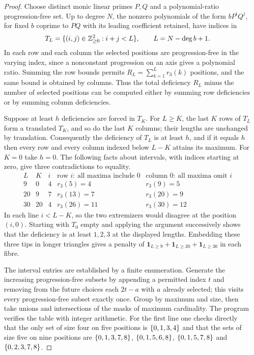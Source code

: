 \begin{proof}
Choose distinct monic linear primes $P,Q$ and a polynomial-ratio progression-free set.
Up to degree $N$, the nonzero polynomials of the form $bP^iQ^j$, for fixed $b$ coprime
to $PQ$ with its leading coefficient retained, have indices in
\[
 T_L=\{(i,j)\in\mathbb{Z}_{\ge0}^2:i+j<L\},\qquad L=N-\deg b+1 .
\]
In each row and each column the selected positions are progression-free in the varying
index, since a nonconstant progression on an axis gives a polynomial ratio. Summing the
row bounds permits $R_L=\sum_{k=1}^Lr_3(k)$ positions, and the same bound is obtained by
columns. Thus the total deficiency $R_L$ minus the number of selected positions can be
computed either by summing row deficiencies or by summing column deficiencies.

Suppose at least $h$ deficiencies are forced in $T_K$. For $L\ge K$, the last $K$ rows of
$T_L$ form a translated $T_K$, and so do the last $K$ columns; their lengths are unchanged
by translation. Consequently the deficiency of $T_L$ is at least $h$, and if it equals $h$
then every row and every column indexed below $L-K$ attains its maximum. For $K=0$ take
$h=0$. The following facts about intervals, with indices starting at zero, give three
contradictions to equality.
\[
\begin{array}{c|c|c|c|c}
 L&K&i&\text{row }i:\ \text{all maxima include }0&
         \text{column }0:\ \text{all maxima omit }i\\ \hline
 9&0&4 &r_3(5)=4&r_3(9)=5\\
 20&9&7&r_3(13)=7&r_3(20)=9\\
 30&20&4&r_3(26)=11&r_3(30)=12
\end{array}
\]
In each line $i<L-K$, so the two extremizers would disagree at the position $(i,0)$.
Starting with $T_0$ empty and applying the argument successively shows that the
deficiency is at least $1,2,3$ at the displayed lengths. Embedding these three tips in
longer triangles gives a penalty of
$\mathbf 1_{L\ge9}+\mathbf 1_{L\ge20}+\mathbf 1_{L\ge30}$ in each fibre.

\gppsloppy The interval entries are established by a finite enumeration. Generate the increasing
progression-free subsets by appending a permitted index $t$ and removing from the future
choices each $2t-a$ with $a$ already selected; this visits every progression-free subset
exactly once. Group by maximum and size, then take unions and intersections of the masks
of maximum cardinality. The program
 verifies
the table with integer arithmetic. For the first line one checks directly that the only
set of size four on five positions is $\{0,1,3,4\}$ and that the sets of size five on
nine positions are $\{0,1,3,7,8\}$, $\{0,1,5,6,8\}$, $\{0,1,5,7,8\}$ and
$\{0,2,3,7,8\}$.


\end{proof}
